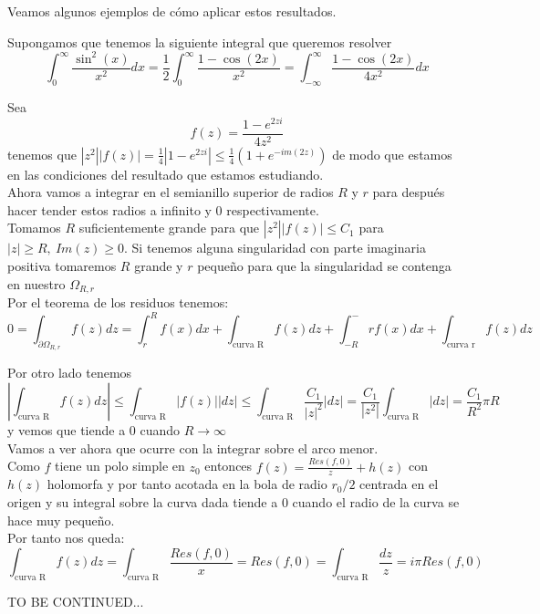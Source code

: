 \documentclass{apuntes}
\begin{document}
\begin{enumerate}
\begin{enumerate}
Veamos algunos ejemplos de cómo aplicar estos resultados.
\begin{example}
Supongamos que tenemos la siguiente integral que queremos resolver
\[\int_0^{\infty} \frac{\sin^2(x)}{x^2}dx = \frac{1}{2}\int_0^{\infty}\frac{1-\cos(2x)}{x^2}=\int_{-\infty}^{\infty} \frac{1-\cos(2x)}{4x^2}dx\]

Sea
\[f(z)=\frac{1-e^{2zi}}{4z^2}\]
tenemos que $|z^2||f(z)|=\frac{1}{4}|1-e^{2zi}| \leq \frac{1}{4}(1+e^{-im(2z)})$ de modo que estamos en las condiciones del resultado que estamos estudiando.\\

Ahora vamos a integrar en el semianillo superior de radios $R$ y $r$ para después hacer tender estos radios a infinito y 0 respectivamente.\\

Tomamos $R$ suficientemente grande para que $|z^2||f(z)| \leq C_1$ para $|z|\geq R, \ Im(z)\geq 0$. Si tenemos alguna singularidad con parte imaginaria positiva tomaremos $R$ grande y $r$ pequeño para que la singularidad se contenga en nuestro $Ω_{R,r}$\\

Por el teorema de los residuos tenemos:
\[0 = \int_{\partial Ω_{R,r}} f(z)dz = \int_r^R f(x)dx +\int_{\text{curva R}}f(z)dz + \int_{-R}^-r f(x)dx + \int_{\text{curva r}} f(z)dz\]

Por otro lado tenemos
\[\left|\int_{\text{curva R}}f(z)dz \right| \leq \int_{\text{curva R}}|f(z)||dz| \leq \int_{\text{curva R}}\frac{C_1}{|z|^2}|dz| = \frac{C_1}{|z^2|}\int_{\text{curva R}}|dz|=\frac{C_1}{R^2}πR \]
y vemos que tiende a 0 cuando $R \to \infty$\\

Vamos a ver ahora que ocurre con la integrar sobre el arco menor.\\

Como $f$ tiene un polo simple en $z_0$ entonces $f(z)=\frac{Res(f,0)}{z}+h(z)$ con $h(z)$ holomorfa y por tanto acotada en la bola de radio $r_0/2$ centrada en el origen y su integral sobre la curva dada tiende a 0 cuando el radio de la curva se hace muy pequeño.\\

Por tanto nos queda:
\[\int_{\text{curva R}} f(z)dz = \int_{\text{curva R}} \frac{Res(f,0)}{x} = Res(f,0)=\int_{\text{curva R}} \frac{dz}{z}=iπRes(f,0)\]

TO BE CONTINUED...



\end{example}
\end{enumerate}
\end{enumerate}
\end{document}
